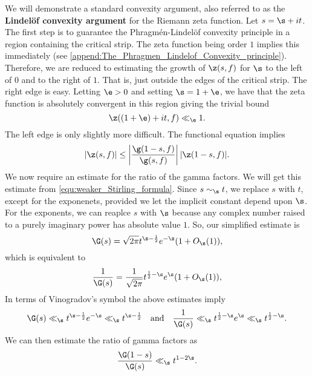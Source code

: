     We will demonstrate a standard convexity argument, also referred to as the \textbf{Lindel\"of convexity argument} for the Riemann zeta function. Let $s = \s+it$. The first step is to guarantee the Phragm\'en-Lindel\"of convexity principle in a region containing the critical strip. The zeta function being order $1$ implies this immediately (see \cref{append:The_Phragmen_Lindelof_Convexity_principle}). Therefore, we are reduced to estimating the growth of $\z(s,f)$ for $\s$ to the left of $0$ and to the right of $1$. That is, just outside the edges of the critical strip. The right edge is easy. Letting $\e > 0$ and setting $\s = 1+\e$, we have that the zeta function is absolutely convergent in this region giving the trivial bound
    \begin{equation}\label{equ:convexity_bound_1}
      \z((1+\e)+it,f) \ll_{\e} 1.
    \end{equation}
    The left edge is only slightly more difficult. The functional equation implies
    \begin{equation}\label{equ:convexity_bound_left_edge}
      |\z(s,f)| \le \left|\frac{\g(1-s,f)}{\g(s,f)}\right||\z(1-s,f)|.
    \end{equation}
    We now require an estimate for the ratio of the gamma factors. We will get this estimate from \cref{equ:weaker_Stirling_formula}. Since $s \sim_{\s} t$, we replace $s$ with $t$, except for the exponenets, provided we let the implicit constant depend upon $\s$. For the exponents, we can reaplce $s$ with $\s$ because any complex number raised to a purely imaginary power has absolute value $1$. So, our simplified estimate is
    \[
      \G(s) = \sqrt{2\pi}t^{\s-\frac{1}{2}}e^{-\s}(1+O_{\s}(1)),
    \]
    which is equivalent to
    \[
      \frac{1}{\G(s)} = \frac{1}{\sqrt{2\pi}}t^{\frac{1}{2}-\s}e^{\s}(1+O_{\s}(1)),
    \]
    In terms of Vinogradov's symbol the above estimates imply
    \[
      \G(s) \ll_{\s} t^{\s-\frac{1}{2}}e^{-\s} \ll_{\s} t^{\s-\frac{1}{2}} \quad \text{and} \quad \frac{1}{\G(s)} \ll_{\s} t^{\frac{1}{2}-\s}e^{\s} \ll_{\s} t^{\frac{1}{2}-\s}.
    \]
    We can then estimate the ratio of gamma factors as 
    \begin{equation}\label{equ:ratio_of_gamma_estimate}
      \frac{\G(1-s)}{\G(s)} \ll_{\s} t^{1-2\s}.
    \end{equation}

